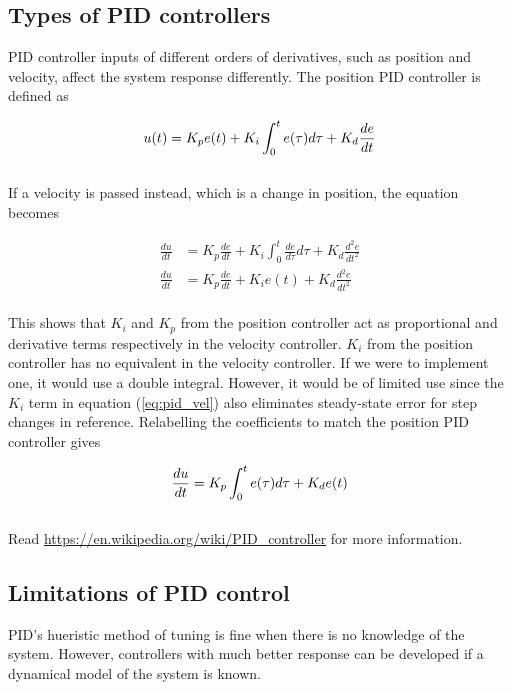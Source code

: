 \documentclass[10pt,conference,compsoc]{IEEEtran}
\begin{document}
\subsection{Types of PID controllers}

PID controller inputs of different orders of derivatives, such as position and
velocity, affect the \gls{system} response differently. The position PID
controller is defined as

\begin{equation}
  u(t) = K_p e(t) + K_i \int_0^t e(\tau) d\tau + K_d \frac{de}{dt} \\
\end{equation}
\\
If a velocity is passed instead, which is a change in position, the equation
becomes

\begin{align}
  \frac{du}{dt} &= K_p \frac{de}{dt} + K_i \int_0^t \frac{de}{d\tau} d\tau +
    K_d \frac{d^2e}{dt^2} \nonumber \\
  \frac{du}{dt} &= K_p \frac{de}{dt} + K_i e(t) + K_d \frac{d^2e}{dt^2}
    \label{eq:pid_vel}
\end{align}
\\
This shows that $K_i$ and $K_p$ from the position controller act as proportional
and derivative terms respectively in the velocity controller. $K_i$ from the
position controller has no equivalent in the velocity controller. If we were to
implement one, it would use a double integral. However, it would be of limited
use since the $K_i$ term in equation (\ref{eq:pid_vel}) also eliminates
steady-state error for step changes in \gls{reference}. Relabelling the
coefficients to match the position PID controller gives

\begin{equation}
  \frac{du}{dt} = K_p \int_0^t e(\tau) d\tau + K_d e(t) \\
\end{equation}
\\
Read \url{https://en.wikipedia.org/wiki/PID_controller} for more information.

\subsection{Limitations of PID control}

PID's hueristic method of tuning is fine when there is no knowledge of the
\gls{system}. However, controllers with much better response can be developed if
a dynamical model of the \gls{system} is known.
\end{document}
